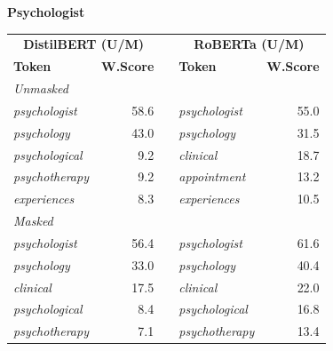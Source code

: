 \documentclass[11pt]{article}
\begin{document}
\vspace{4pt}\noindent\textbf{Psychologist}
\begin{center}\scriptsize
\begin{tabular}{lrllr}
\toprule
\multicolumn{2}{c}{\textbf{DistilBERT (U/M)}} & & \multicolumn{2}{c}{\textbf{RoBERTa (U/M)}} \\
\textbf{Token} & \textbf{W.Score} & & \textbf{Token} & \textbf{W.Score} \\
\midrule
\multicolumn{5}{l}{\textit{Unmasked}} \\
\emph{psychologist} & 58.6 & & \emph{psychologist} & 55.0 \\
\emph{psychology} & 43.0 & & \emph{psychology} & 31.5 \\
\emph{psychological} & 9.2 & & \emph{clinical} & 18.7 \\
\emph{psychotherapy} & 9.2 & & \emph{appointment} & 13.2 \\
\emph{experiences} & 8.3 & & \emph{experiences} & 10.5 \\
\multicolumn{5}{l}{\textit{Masked}} \\
\emph{psychologist} & 56.4 & & \emph{psychologist} & 61.6 \\
\emph{psychology} & 33.0 & & \emph{psychology} & 40.4 \\
\emph{clinical} & 17.5 & & \emph{clinical} & 22.0 \\
\emph{psychological} & 8.4 & & \emph{psychological} & 16.8 \\
\emph{psychotherapy} & 7.1 & & \emph{psychotherapy} & 13.4 \\
\bottomrule
\end{tabular}
\end{center}
\end{document}
